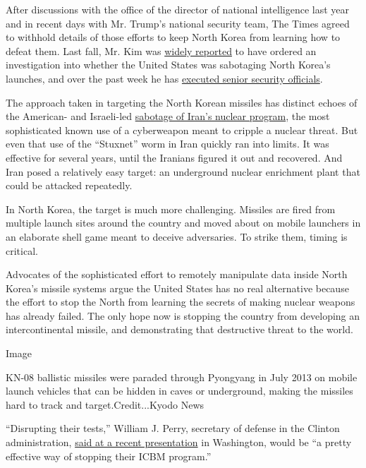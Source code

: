 After discussions with the office of the director of national
intelligence last year and in recent days with Mr. Trump's national
security team, The Times agreed to withhold details of those efforts to
keep North Korea from learning how to defeat them. Last fall, Mr. Kim
was
\href{https://www.nknews.org/2016/10/kim-jong-un-to-investigate-espionage-linked-to-failed-missile-launch-report/}{widely
reported} to have ordered an investigation into whether the United
States was sabotaging North Korea's launches, and over the past week he
has
\href{https://www.nytimes3xbfgragh.onion/aponline/2017/02/27/world/asia/ap-as-north-korea-executions.html}{executed
senior security officials}.

The approach taken in targeting the North Korean missiles has distinct
echoes of the American- and Israeli-led
\href{http://www.nytimes3xbfgragh.onion/2011/01/16/world/middleeast/16stuxnet.html}{sabotage
of Iran's nuclear program}, the most sophisticated known use of a
cyberweapon meant to cripple a nuclear threat. But even that use of the
``Stuxnet'' worm in Iran quickly ran into limits. It was effective for
several years, until the Iranians figured it out and recovered. And Iran
posed a relatively easy target: an underground nuclear enrichment plant
that could be attacked repeatedly.

In North Korea, the target is much more challenging. Missiles are fired
from multiple launch sites around the country and moved about on mobile
launchers in an elaborate shell game meant to deceive adversaries. To
strike them, timing is critical.

Advocates of the sophisticated effort to remotely manipulate data inside
North Korea's missile systems argue the United States has no real
alternative because the effort to stop the North from learning the
secrets of making nuclear weapons has already failed. The only hope now
is stopping the country from developing an intercontinental missile, and
demonstrating that destructive threat to the world.

Image

KN-08 ballistic missiles were paraded through Pyongyang in July 2013 on
mobile launch vehicles that can be hidden in caves or underground,
making the missiles hard to track and target.Credit...Kyodo News

``Disrupting their tests,'' William J. Perry, secretary of defense in
the Clinton administration,
\href{http://38north.org/wp-content/uploads/2017/01/2017-0109-38-North-Press-Briefing-Transcript.pdf}{said
at a recent presentation} in Washington, would be ``a pretty effective
way of stopping their ICBM program.''

